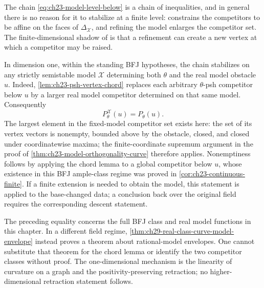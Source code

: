 \begin{remark}
\label{rem:ch23-model-dependence}
The chain \eqref{eq:ch23-model-level-below} is a chain of inequalities, and
in general there is no reason for it to stabilize at a finite level:
 constrains the competitors to be affine
on the faces of \(\Delta_{\mathcal X}\), and refining the model enlarges the
competitor set.  The finite-dimensional shadow of
 is that a refinement can create a new vertex
at which a competitor may be raised.

In dimension one, within the standing BFJ hypotheses, the chain
stabilizes on any strictly semistable model \(\mathcal X\)
determining both \(\theta\) and the real model obstacle \(u\).
Indeed, \cref{lem:ch23-psh-vertex-chord} replaces each arbitrary
\(\theta\)-psh competitor below \(u\) by a larger real model
competitor determined on that same model.  Consequently
\[
                    P^{\mathcal X}_\theta(u)=P_\theta(u).
\]
The largest element in the fixed-model competitor set exists here:
the set of its vertex vectors is nonempty, bounded above by the
obstacle, closed, and closed under coordinatewise maxima; the
finite-coordinate supremum argument in the proof of
\cref{thm:ch23-model-orthogonality-curve} therefore applies.
Nonemptiness follows by applying the chord lemma to a global
competitor below \(u\), whose existence in this BFJ ample-class
regime was proved in \cref{cor:ch23-continuous-finite}.
If a finite extension is needed to obtain the model, this statement
is applied to the base-changed data; a conclusion back over the
original field requires the corresponding descent statement.

The preceding equality concerns the full BFJ class and real model
functions in this chapter.  In a different field regime,
\cref{thm:ch29-real-class-curve-model-envelope} instead proves a
theorem about rational-model envelopes.  One cannot substitute
that theorem for the chord lemma or identify the two competitor
classes without proof.  The one-dimensional mechanism is the
linearity of curvature on a graph and the positivity-preserving
retraction; no higher-dimensional retraction statement follows.


\end{remark}

